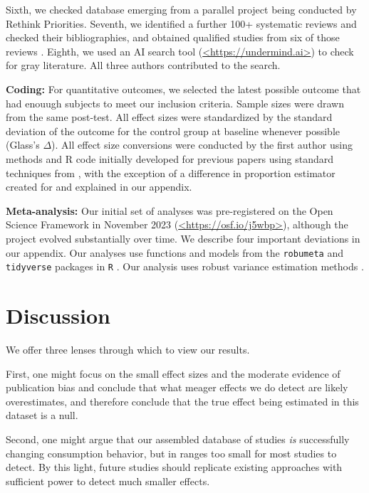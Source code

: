 \documentclass[sn-nature,pdflatex]{sn-jnl}
\begin{document}
Sixth, we checked database emerging from a parallel project being
conducted by Rethink Priorities. Seventh, we identified a further 100+
systematic reviews and checked their bibliographies, and obtained
qualified studies from six of those reviews
\citep{ammann2023, chang2023, DiGennaro2024, harguess2020, ronto2022, wynes2018}.
Eighth, we used an AI search tool (\url{<https://undermind.ai>}) to
check for gray literature. All three authors contributed to the search.

\textbf{Coding:} For quantitative outcomes, we selected the latest
possible outcome that had enouugh subjects to meet our inclusion
criteria. Sample sizes were drawn from the same post-test. All effect
sizes were standardized by the standard deviation of the outcome for the
control group at baseline whenever possible (Glass's \(\Delta\)). All
effect size conversions were conducted by the first author using methods
and R code initially developed for previous papers
\citep{paluck2019, paluck2021, porat2024} using standard techniques from
\citep{cooper2019}, with the exception of a difference in proportion
estimator created for \citep{paluck2021} and explained in our appendix.

\textbf{Meta-analysis:} Our initial set of analyses was pre-registered
on the Open Science Framework in November 2023
(\url{<https://osf.io/j5wbp>}), although the project evolved
substantially over time. We describe four important deviations in our
appendix. Our analyses use functions and models from the
\texttt{robumeta} \citep{fisher2015} and \texttt{tidyverse}
\citep{wickham2019} packages in \texttt{R} \citep{Rlang}. Our analysis
uses robust variance estimation methods \citep{hedges2010}.

\section{Discussion}\label{Sec4}

We offer three lenses through which to view our results.

First, one might focus on the small effect sizes and the moderate
evidence of publication bias and conclude that what meager effects we do
detect are likely overestimates, and therefore conclude that the true
effect being estimated in this dataset is a null.

Second, one might argue that our assembled database of studies \emph{is}
successfully changing consumption behavior, but in ranges too small for
most studies to detect. By this light, future studies should replicate
existing approaches with sufficient power to detect much smaller
effects.
\end{document}
